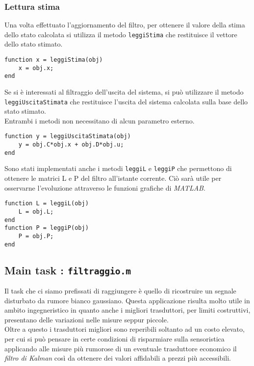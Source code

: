 \subsubsection{Lettura stima}
Una volta effettuato l'aggiornamento del filtro, per ottenere il valore della stima dello stato calcolata si utilizza il metodo \texttt{leggiStima} che restituisce il vettore dello stato stimato.
\begin{lstlisting}[frame=single]
function x = leggiStima(obj)
    x = obj.x;
end
\end{lstlisting}
Se si è interessati al filtraggio dell'uscita del sistema, si può utilizzare il metodo \texttt{leggiUscitaStimata} che restituisce l'uscita del sistema calcolata sulla base dello stato stimato.\\
Entrambi i metodi non necessitano di alcun parametro esterno.
\begin{lstlisting}[frame=single]
function y = leggiUscitaStimata(obj)
	y = obj.C*obj.x + obj.D*obj.u;
end
\end{lstlisting}
Sono stati implementati anche i metodi \texttt{leggiL} e \texttt{leggiP} che permettono di ottenere le matrici L e P del filtro all'istante corrente. Ciò sarà utile per osservarne l'evoluzione attraverso le funzioni grafiche di \textit{MATLAB}.
\begin{lstlisting}[frame=single]
function L = leggiL(obj)
	L = obj.L;
end
function P = leggiP(obj)
	P = obj.P;
end
\end{lstlisting}
\newpage

\subsection{Main task : \texttt{filtraggio.m}}
Il task che ci siamo prefissati di raggiungere è quello di ricostruire un segnale disturbato da rumore bianco gaussiano. Questa applicazione risulta molto utile in ambito ingegneristico in quanto anche i migliori trasduttori, per limiti costruttivi, presentano delle variazioni nelle misure seppur piccole.\\
Oltre a questo i trasduttori migliori sono reperibili soltanto ad un costo elevato, per cui si può pensare in certe condizioni di risparmiare sulla sensoristica applicando alle misure più rumorose di un eventuale trasduttore economico il \textit{filtro di Kalman} così da ottenere dei valori affidabili a prezzi più accessibili.

